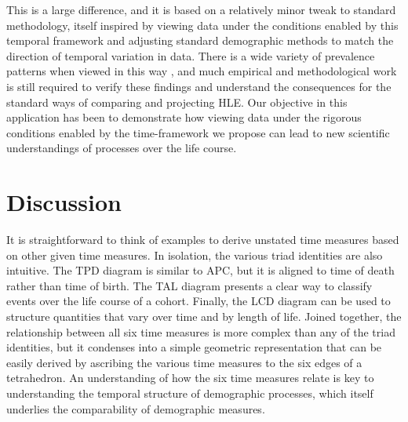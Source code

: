 \documentclass[12pt,oneside,a4paper]{article} %
\begin{document}
This is a large difference, and it is based on a relatively minor tweak to
standard methodology, itself inspired by viewing data under the conditions
enabled by this temporal framework and adjusting standard demographic methods
to match the direction of temporal variation in data. There is a wide variety of
prevalence patterns when viewed in this way \citep{riffe2015ttd,
wolf2015disability}, and much empirical and methodological work is still required to verify
these findings and understand the consequences for the standard ways of
comparing and projecting HLE. Our objective in this application has been
to demonstrate how viewing data under the rigorous conditions enabled by the
time-framework we propose can lead to new scientific understandings of
processes over the life course.



\FloatBarrier
\section*{Discussion}

It is straightforward to
think of examples to derive unstated time measures based on other given
time measures. In isolation, the various triad identities are also intuitive.
The TPD diagram is similar to APC, but it is aligned to time of death rather
than time of birth. The TAL diagram presents a clear way to classify events
over the life course of a cohort. Finally, the LCD diagram can be used to
structure quantities that vary over time and by length of life.
Joined together, the relationship between all six time measures is more
complex than any of the triad identities, but it condenses into a simple
geometric representation that can be easily derived by ascribing the various time measures to the six edges of a tetrahedron. An understanding of how the six time measures relate is
key to understanding the temporal structure of demographic processes, which
itself underlies the comparability of demographic measures.
\end{document}
